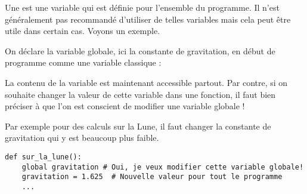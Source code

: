 \documentclass[11pt,class=report,crop=false]{standalone}
\begin{document}


\begin{cours}


Une  est une variable qui est définie pour l'ensemble du programme. Il n'est généralement pas recommandé d'utiliser de telles variables mais cela peut être utile dans certain cas. Voyons un exemple.

On déclare la variable globale, ici la constante de gravitation, en début de programme comme une variable classique : 

La contenu de la variable  est maintenant accessible partout.
Par contre, si on souhaite changer la valeur de cette variable dans une fonction, il faut bien préciser à \Python{} que l'on est conscient de modifier une variable globale !

Par exemple pour des calculs sur la Lune, il faut changer la constante de gravitation qui y est beaucoup plus faible.

\begin{lstlisting}
def sur_la_lune():
    global gravitation # Oui, je veux modifier cette variable globale!
    gravitation = 1.625  # Nouvelle valeur pour tout le programme    
    ...
\end{lstlisting}

\end{cours}


\end{document}
